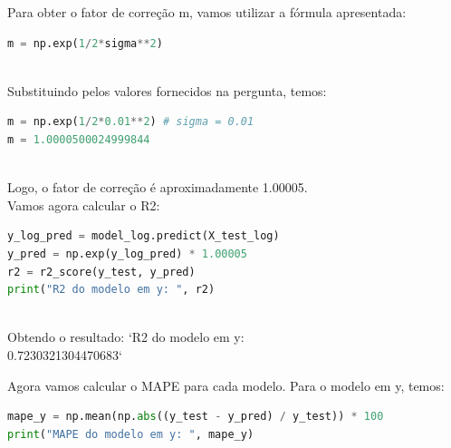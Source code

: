 \documentclass[a4paper, 12pt]{article}
\begin{document}
Para obter o fator de correção m, vamos utilizar a fórmula apresentada:\\

\begin{tcolorbox}[colback=white,boxrule=1pt,arc=5pt,auto outer arc]
  \begin{lstlisting}[language=Python]
m = np.exp(1/2*sigma**2)
    \end{lstlisting}
\end{tcolorbox} \\

Substituindo pelos valores fornecidos na pergunta, temos:

\begin{tcolorbox}[colback=white,boxrule=1pt,arc=5pt,auto outer arc]
  \begin{lstlisting}[language=Python]
m = np.exp(1/2*0.01**2) # sigma = 0.01
m = 1.0000500024999844

    \end{lstlisting}
\end{tcolorbox} \\
Logo, o fator de correção é aproximadamente 1.00005.\\

Vamos agora calcular o R2:\\

\begin{tcolorbox}[colback=white,boxrule=1pt,arc=5pt,auto outer arc]
  \begin{lstlisting}[language=Python]
y_log_pred = model_log.predict(X_test_log)
y_pred = np.exp(y_log_pred) * 1.00005
r2 = r2_score(y_test, y_pred)
print("R2 do modelo em y: ", r2)
    \end{lstlisting}
\end{tcolorbox} \\

Obtendo o resultado: `R2 do modelo em y: \\ 0.7230321304470683`

Agora vamos calcular o MAPE para cada modelo. Para o modelo em y, temos:\\

\begin{tcolorbox}[colback=white,boxrule=1pt,arc=5pt,auto outer arc]
  \begin{lstlisting}[language=Python]
mape_y = np.mean(np.abs((y_test - y_pred) / y_test)) * 100
print("MAPE do modelo em y: ", mape_y)
    \end{lstlisting}
\end{tcolorbox} \\
\end{document}
